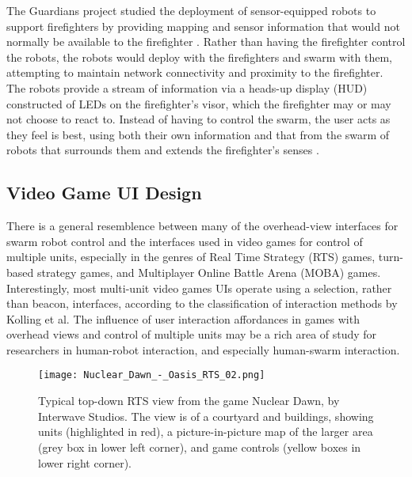 The Guardians project studied the deployment of sensor-equipped robots to support firefighters by providing mapping and sensor information that would not normally be available to the firefighter \citep{gancet2010user}.
Rather than having the firefighter control the robots, the robots would deploy with the firefighters and swarm with them, attempting to maintain network connectivity and proximity to the firefighter. 
The robots provide a stream of information via a heads-up display (HUD) constructed of LEDs on the firefighter's visor, which the firefighter may or may not choose to react to. 
Instead of having to control the swarm, the user acts as they feel is best, using both their own information and that from the swarm of robots that surrounds them and extends the firefighter's senses \citep{penders2011robot}. 


\subsection{Video Game UI Design} \label{section:Video_Game_UI_Design}

There is a general resemblence between many of the overhead-view interfaces for swarm robot control and the interfaces used in video games for control of multiple units, especially in the genres of Real Time Strategy (RTS) games, turn-based strategy games, and Multiplayer Online Battle Arena (MOBA) games. 
Interestingly, most multi-unit video games UIs operate using a selection, rather than beacon, interfaces, according to the classification of interaction methods by Kolling et al. 
The influence of user interaction affordances in games with overhead views and control of multiple units may be a rich area of study for researchers in human-robot interaction, and especially human-swarm interaction. 

\begin{figure}
	\centering
	\texttt{[image: Nuclear\_Dawn\_-\_Oasis\_RTS\_02.png]}
	\caption{Typical top-down RTS view from the game Nuclear Dawn, by Interwave Studios. The view is of a courtyard and buildings, showing units (highlighted in red), a picture-in-picture map of the larger area (grey box in lower left corner), and game controls (yellow boxes in lower right corner)\citep{nucleardawn}.}
	\label{fig:Nuclear_dawn_rts}
\end{figure}


